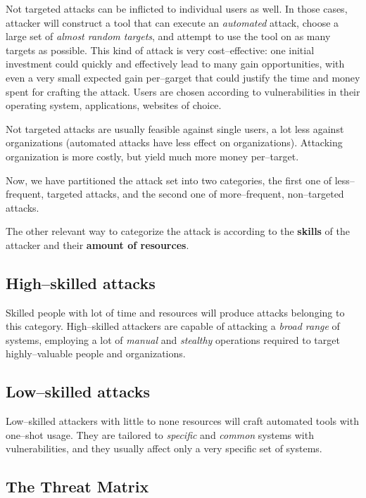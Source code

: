 \documentclass[10pt]{extbook}
\begin{document}
Not targeted attacks can be inflicted to individual users as well.
In those cases, attacker will construct a tool that can execute an
\emph{automated} attack, choose a large set of \emph{almost random targets},
and attempt to use the tool on as many targets as possible. This kind of attack
is very cost--effective: one initial investment could quickly and effectively
lead to many gain opportunities, with even a very small expected gain
per--garget that could justify the time and money spent for crafting the
attack. Users are chosen according to vulnerabilities in their operating
system, applications, websites of choice.

Not targeted attacks are usually feasible against single users, a lot
less against organizations (automated attacks have less effect on
organizations). Attacking organization is more costly, but yield much more
money per--target.

\bigskip

Now, we have partitioned the attack set into two categories, the first one of
less--frequent, targeted attacks, and the second one of more--frequent,
non--targeted attacks.

The other relevant way to categorize the attack is according to the
\textbf{skills} of the attacker and their \textbf{amount of resources}.

\subsection{High--skilled attacks}

Skilled people with lot of time and resources will produce attacks belonging to
this category. High--skilled attackers are capable of attacking a \emph{broad
range} of systems, employing a lot of \emph{manual} and \emph{stealthy}
operations required to target highly--valuable people and organizations.

\subsection{Low--skilled attacks}

Low--skilled attackers with little to none resources will craft automated tools
with one--shot usage. They are tailored to \emph{specific} and \emph{common}
systems with vulnerabilities, and they usually affect only a very specific set
of systems.

\subsection{The Threat Matrix}
\end{document}
